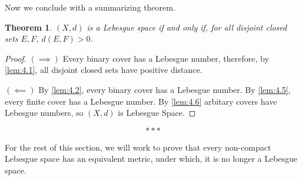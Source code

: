 \documentclass[openany, amssymb, psamsfonts]{amsart}
\let\fullref\autoref
\newtheorem{thm}{Theorem}[section]
\theoremstyle{definition}
\numberwithin{equation}{section}
\begin{document}
Now we conclude with a summarizing theorem. 
\begin{thm}\label{thm:4.7}
  $(X,d)$ is a Lebesgue space if and only if, for all disjoint closed sets $E,F$, $d(E,F)>0$.
\end{thm}
\begin{proof}
  $(\implies)$ Every binary cover has a Lebesgue number, therefore, by \fullref{lem:4.1}, all disjoint closed sets have positive distance. 

  $(\impliedby)$ By \fullref{lem:4.2}, every binary cover has a Lebesgue number. By \fullref{lem:4.5}, every finite cover has a Lebesgue number. By \fullref{lem:4.6} arbitary covers have Lebesgue numbers, so $(X,d)$ is Lebesgue Space.
\end{proof}
\[
  \ast \ast \ast
\]

For the rest of this section, we will work to prove that every non-compact Lebesgue space has an equivalent metric, under which, it is no longer a Lebesgue space. 
\end{document}
